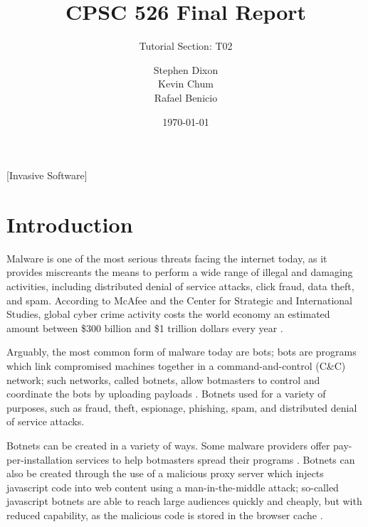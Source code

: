 \documentclass{acm_proc_article-sp}
\begin{document}
\title{CPSC 526 Final Report}
\subtitle{Tutorial Section: T02}
\date{\today}
\author{
\alignauthor
Stephen Dixon\\
\alignauthor
Kevin Chum\\
\alignauthor
Rafael Benicio\\
}

\maketitle

\begin{abstract}

\end{abstract}
[Invasive Software]

\section{Introduction}

Malware is one of the most serious threats facing the internet today, as it provides miscreants the means to perform a wide range of illegal and damaging activities, including distributed denial of service attacks, click fraud, data theft, and spam. According to McAfee and the Center for Strategic and International Studies, global cyber crime activity costs the world economy an estimated amount between \$300 billion and \$1 trillion dollars every year \cite{lewis:economics}.

Arguably, the most common form of malware today are bots; bots are programs which link compromised machines together in a command-and-control (C\&C) network; such networks, called botnets, allow botmasters to control and coordinate the bots by uploading payloads \cite{jacob:infiltration}.  Botnets used for a variety of purposes, such as fraud, theft, espionage, phishing, spam, and distributed denial of service attacks.

Botnets can be created in a variety of ways.  Some malware providers offer pay-per-installation services to help botmasters spread their programs \cite{caballero:distribution}.  Botnets can also be created through the use of a malicious proxy server which injects javascript code into web content using a man-in-the-middle attack; so-called javascript botnets are able to reach large audiences quickly and cheaply, but with reduced capability, as the malicious code is stored in the browser cache \cite{defcon:javascript}.
\end{document}
